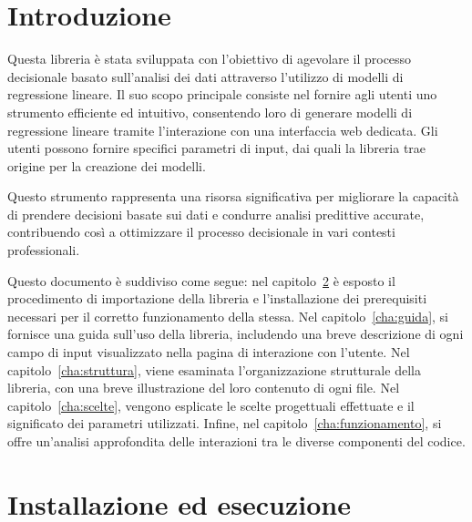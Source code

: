 \documentclass{rapportECL}
\begin{document}


        
\margins 
\mytitlepage
{}
\toc 
\fig



\cleardoublepage 

\chapter{Introduzione}
\label{cha:intro}

Questa libreria è stata sviluppata con l'obiettivo di agevolare il processo decisionale basato sull'analisi dei dati attraverso l'utilizzo 
di modelli di regressione lineare. Il suo scopo principale consiste nel fornire agli utenti uno strumento efficiente ed intuitivo, 
consentendo loro di generare modelli di regressione lineare tramite l'interazione con una interfaccia web dedicata. 
Gli utenti possono fornire specifici parametri di input, dai quali la libreria trae origine per la creazione dei modelli.

Questo strumento rappresenta una risorsa significativa per migliorare la capacità di prendere decisioni basate sui dati e condurre
analisi predittive accurate, contribuendo così a ottimizzare il processo decisionale in vari contesti professionali.

Questo documento è suddiviso come segue: nel capitolo~\ref{cha:import} è esposto il procedimento di importazione della libreria 
e l'installazione dei prerequisiti necessari per il corretto funzionamento della stessa. 
Nel capitolo~\ref{cha:guida}, si fornisce una guida sull'uso della libreria, includendo una breve descrizione di ogni campo di input visualizzato 
nella pagina di interazione con l'utente. Nel capitolo~\ref{cha:struttura}, viene esaminata l'organizzazione strutturale della libreria, 
con una breve illustrazione del loro contenuto di ogni file. Nel capitolo~\ref{cha:scelte}, vengono esplicate le scelte progettuali effettuate 
e il significato dei parametri utilizzati. Infine, nel capitolo~\ref{cha:funzionamento}, si offre un'analisi approfondita delle interazioni tra 
le diverse componenti del codice.

\chapter{Installazione ed esecuzione}
\label{cha:import}
\end{document}
